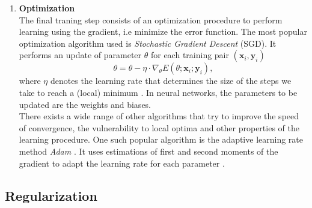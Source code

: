 \documentclass[bsc,frontabs,twoside,singlespacing,parskip,deptreport]{infthesis}     %
\let\Oldsubsection\subsection
\renewcommand{\subsection}{\FloatBarrier\Oldsubsection}
\begin{document}
\begin{enumerate}

     
     
    \item{ \bf{Optimization} } \\ 
    The final traning step consists of an optimization procedure to perform learning using the gradient, i.e minimize the error function. The most popular optimization algorithm used is \textit{Stochastic Gradient Descent} (SGD). It performs an update of parameter \(\theta\) for each training pair \((\mathbf{x}_i,\mathbf{y}_i)\)
    \[\theta=\theta-\eta \cdot \nabla_{\theta} E\left(\theta ; \mathbf{x}_i ; \mathbf{y}_i\right),\]
    where \(\eta\) denotes the learning rate that determines the size of the steps we take to reach a (local) minimum \cite{ruder_overview_2017}. In neural networks, the parameters to be updated are the weights and biases.\\ There exists a wide range of other algorithms that try to improve the speed of convergence, the vulnerability to local optima and other properties of the learning procedure. One such popular algorithm is the adaptive learning rate method \textit{Adam} \cite{ruder_overview_2017}. It uses estimations of first and second moments of the gradient to adapt the learning rate for each parameter \cite{ruder_overview_2017}.
    
\end{enumerate}

  



\subsection{Regularization}
\end{document}

